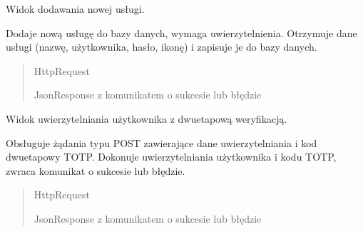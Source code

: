 \documentclass[letterpaper,10pt,polish]{sphinxmanual}
\begin{document}
\begin{fulllineitems}
\label{\detokenize{mainApp:mainApp.views.add_service}}
\pysigstartsignatures
{}
\pysigstopsignatures
\sphinxAtStartPar
Widok dodawania nowej usługi.

\sphinxAtStartPar
Dodaje nową usługę do bazy danych, wymaga uwierzytelnienia.
Otrzymuje dane usługi (nazwę, użytkownika, hasło, ikonę) i zapisuje je do bazy danych.
\begin{quote}\begin{description}
\sphinxAtStartPar
{} \textendash{} HttpRequest

\sphinxAtStartPar
JsonResponse z komunikatem o sukcesie lub błędzie

\end{description}\end{quote}

\end{fulllineitems}


\begin{fulllineitems}
\label{\detokenize{mainApp:mainApp.views.authenticate_view}}
\pysigstartsignatures
{}
\pysigstopsignatures
\sphinxAtStartPar
Widok uwierzytelniania użytkownika z dwuetapową weryfikacją.

\sphinxAtStartPar
Obsługuje żądania typu POST zawierające dane uwierzytelniania i kod dwuetapowy TOTP.
Dokonuje uwierzytelniania użytkownika i kodu TOTP, zwraca komunikat o sukcesie lub błędzie.
\begin{quote}\begin{description}
\sphinxAtStartPar
{} \textendash{} HttpRequest

\sphinxAtStartPar
JsonResponse z komunikatem o sukcesie lub błędzie

\end{description}\end{quote}

\end{fulllineitems}
\end{document}
